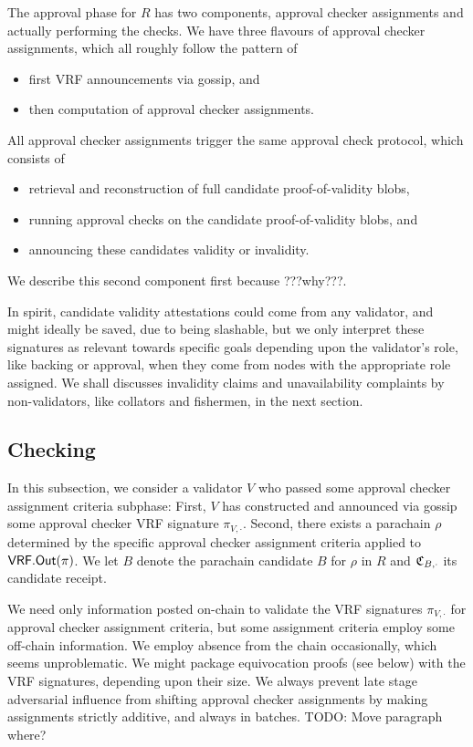 The approval phase for $R$ has two components, approval checker assignments and actually performing the checks.  We have three flavours of approval checker assignments, which all roughly follow the pattern of
\begin{itemize}
\item first VRF announcements via gossip, and
\item then computation of approval checker assignments.
\end{itemize}
\noindent 
All approval checker assignments trigger the same approval check protocol, which consists of
\begin{itemize}
\item retrieval and reconstruction of full candidate proof-of-validity blobs, 
\item running approval checks on the candidate proof-of-validity blobs, and 
\item announcing these candidates validity or invalidity.
\end{itemize}
We describe this second component first because ???why???.

In spirit, candidate validity attestations could come from any validator, and might ideally be saved, due to being slashable, but we only interpret these signatures as relevant towards specific goals depending upon the validator's role, like backing or approval, when they come from nodes with the appropriate role assigned.  We shall discusses invalidity claims and unavailability complaints by non-validators, like collators and fishermen, in the next section.


\subsection{Checking}
\label{sec:approcal_checks}

In this subsection, we consider a validator $V$ who passed some approval checker assignment criteria subphase:  First, $V$ has constructed and announced via gossip some approval checker VRF signature $\pi_{V,\cdot}$.  Second, there exists a parachain $\rho$ determined by the specific approval checker assignment criteria applied to $\mathsf{VRF}.\mathsf{Out}(\pi)$.  We let $B$ denote the parachain candidate $B$ for $\rho$ in $R$ and $\mathfrak{C}_{B,\cdot}$ its candidate receipt.  

We need only information posted on-chain to validate the VRF signatures $\pi_{V,\cdot}$ for approval checker assignment criteria, but some assignment criteria employ some off-chain information.  We employ absence from the chain occasionally, which seems unproblematic.  We might package equivocation proofs (see below) with the VRF signatures, depending upon their size.  We always prevent late stage adversarial influence from shifting approval checker assignments by making assignments strictly additive, and always in batches.
%
TODO: Move paragraph where?


